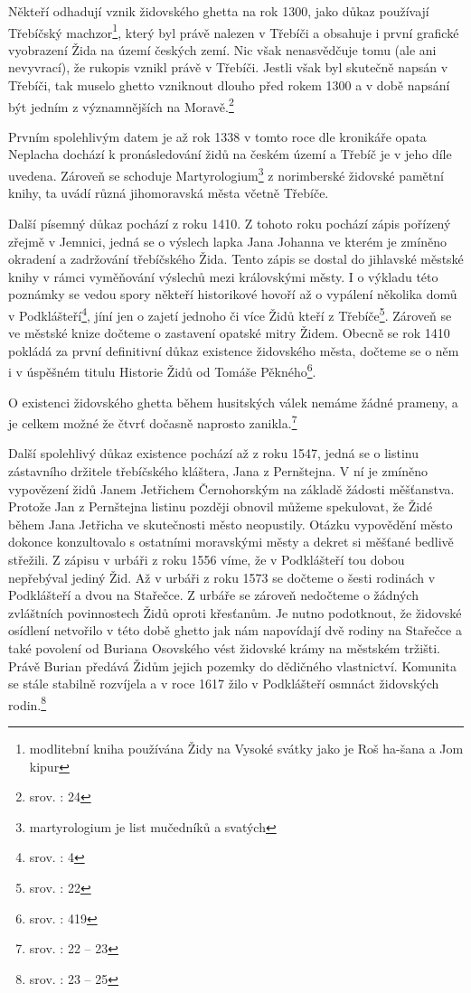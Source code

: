 \documentclass[a4paper,oneside,12p]{report}
\begin{document}
Někteří odhadují vznik židovského ghetta na rok 1300, jako důkaz používají Třebíčský machzor\footnote{modlitební kniha používána Židy na Vysoké svátky jako je Roš ha-šana a Jom kipur}, který byl právě nalezen v Třebíči a obsahuje i první grafické vyobrazení Žida na území českých zemí.
Nic však nenasvědčuje tomu (ale ani nevyvrací), že rukopis vznikl právě v Třebíči.
Jestli však byl skutečně napsán v Třebíči, tak muselo ghetto vzniknout dlouho před rokem 1300 a v době napsání být jedním z významnějších na Moravě.\footnote{srov. : 24}

Prvním spolehlivým datem je až rok 1338 v tomto roce dle kronikáře opata Neplacha dochází k pronásledování židů na českém území a Třebíč je v jeho díle uvedena.
Zároveň se schoduje Martyrologium\footnote{martyrologium je list mučedníků a svatých} z norimberské židovské pamětní knihy, ta uvádí různá jihomoravská města včetně Třebíče.

Další písemný důkaz pochází z roku 1410.
Z tohoto roku pochází zápis pořízený zřejmě v Jemnici, jedná se o výslech lapka Jana Johanna ve kterém je zmíněno okradení a zadržování třebíčského Žida.
Tento zápis se dostal do jihlavské městské knihy v rámci vyměňování výslechů mezi královskými městy.
I o výkladu této poznámky se vedou spory někteří historikové hovoří až o vypálení několika domů v Podklášteří\footnote{srov. : 4}, jíní jen o zajetí jednoho či více Židů kteří z Třebíče\footnote{srov. \cite{Fiser2005}: 22}.
Zároveň se ve městské knize dočteme o zastavení opatské mitry Židem.
Obecně se rok 1410 pokládá za první definitivní důkaz existence židovského města, dočteme se o něm i v úspěšném titulu Historie Židů od Tomáše Pěkného\footnote{srov. : 419}.

O existenci židovského ghetta během husitských válek nemáme žádné prameny, a je celkem možné že čtvrť dočasně naprosto zanikla.\footnote{srov. \cite{Fiser2005}: 22 -- 23}

Další spolehlivý důkaz existence pochází až z roku 1547, jedná se o listinu zástavního držitele třebíčského kláštera, Jana z Pernštejna.
V ní je zmíněno vypovězení židů Janem Jetřichem Černohorským na základě žádosti měšťanstva.
Protože Jan z Pernštejna listinu později obnovil můžeme spekulovat, že Židé během Jana Jetřicha ve skutečnosti město neopustily.
Otázku vypovědění město dokonce konzultovalo s ostatními moravskými městy a dekret si měšťané bedlivě střežili.
Z zápisu v urbáři z roku 1556 víme, že v Podklášteří tou dobou nepřebýval jediný Žid.
Až v urbáři z roku 1573 se dočteme o šesti rodinách v Podklášteří a dvou na Stařečce.
Z urbáře se zároveň nedočteme o žádných zvláštních povinnostech Židů oproti křesťanům.
Je nutno podotknout, že židovské osídlení netvořilo v této době ghetto jak nám napovídají dvě rodiny na Stařečce a také povolení od Buriana Osovského vést židovské krámy na městském tržišti.
Právě Burian předává Židům jejich pozemky do dědičného vlastnictví.
Komunita se stále stabilně rozvíjela a v roce 1617 žilo v Podklášteří osmnáct židovských rodin.\footnote{srov. \cite{Fiser2005}: 23 -- 25}
\end{document}
